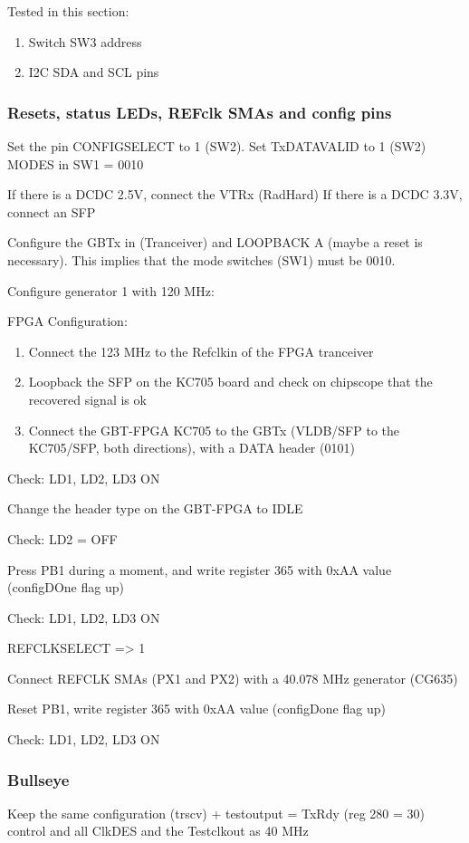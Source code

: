 Tested in this section:
\begin{enumerate}
    \item Switch SW3 address
    \item I2C SDA and SCL pins
\end{enumerate}

\subsubsection{Resets, status LEDs, REFclk SMAs and config pins}

Set the pin CONFIGSELECT to 1 (SW2). Set TxDATAVALID to 1 (SW2)
MODES in SW1 = 0010

If there is a DCDC 2.5V, connect the VTRx (RadHard)
If there is a DCDC 3.3V, connect an SFP

Configure the GBTx in (Tranceiver) and LOOPBACK A (maybe a reset is necessary). This implies that the mode switches (SW1) must be 0010.

Configure generator 1 with 120 MHz:

FPGA Configuration:
\begin{enumerate}
    \item Connect the 123 MHz to the Refclkin of the FPGA tranceiver
    \item Loopback the SFP on the KC705 board and check on chipscope that the recovered signal is ok
    \item Connect the GBT-FPGA KC705 to the GBTx (VLDB/SFP to the KC705/SFP, both directions), with a DATA header (0101)
\end{enumerate}

Check: LD1, LD2, LD3 ON

Change the header type on the GBT-FPGA to IDLE

Check: LD2 = OFF

Press PB1 during a moment, and write register 365 with 0xAA value (configDOne flag up)

Check: LD1, LD2, LD3 ON

REFCLKSELECT => 1

Connect REFCLK SMAs (PX1 and PX2) with a 40.078 MHz generator (CG635)

Reset PB1, write register 365 with 0xAA value (configDone flag up)

Check: LD1, LD2, LD3 ON

\subsubsection{Bullseye}
Keep the same configuration (trscv) + testoutput = TxRdy (reg 280 = 30) control and all ClkDES and the Testclkout as 40 MHz

